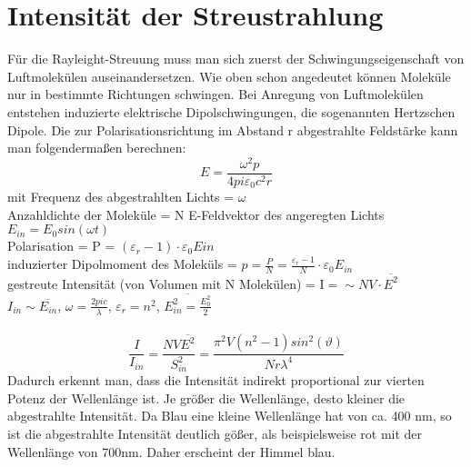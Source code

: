 \section{ Intensität der Streustrahlung}
Für die Rayleight-Streuung muss man sich zuerst der Schwingungseigenschaft von Luftmolekülen auseinandersetzen. Wie oben schon angedeutet können Moleküle nur in bestimmte Richtungen schwingen. Bei Anregung von Luftmolekülen entstehen induzierte elektrische Dipolschwingungen, die sogenannten Hertzschen Dipole. 
Die zur Polarisationsrichtung im Abstand r abgestrahlte Feldstärke kann man folgendermaßen berechnen:
\begin{equation}
E=\frac{\omega^2p}{4pi\varepsilon_0c^2r}
\end{equation}
mit Frequenz des abgestrahlten Lichts = $\omega$\\
Anzahldichte der Moleküle = N
E-Feldvektor des angeregten Lichts $E_{in}=E_0sin(\omega t)$\\
Polarisation = P = $(\varepsilon_r-1)\cdot\varepsilon_0E{in}$\\
induzierter Dipolmoment des Moleküls = $p=\frac{P}{N}=\frac{\varepsilon_r-1}{N}\cdot\varepsilon_0E_{in}$\\
gestreute Intensität (von Volumen mit N Molekülen) = I$=\sim NV\cdot\overline{E^2}$\\
$I_{in}\sim\overline{E_{in}}$, $\omega=\frac{2pic}{\lambda}$, $\varepsilon_r=n^2$, $\overline{E^2_{in}=\frac{E_0^2}{2}}$  \\\\
\begin{equation}
\frac{I}{I_{in}}=\frac{NV\overline{E^2}}{S^2_{in}}=\frac{\pi^2V(n^2-1)sin^2(\vartheta)}{Nr\lambda^4}
\end{equation}
Dadurch erkennt man, dass die Intensität indirekt proportional zur vierten Potenz der Wellenlänge ist. Je größer die Wellenlänge, desto kleiner die abgestrahlte Intensität. Da Blau eine kleine Wellenlänge hat von ca. 400 nm, so ist die abgestrahlte Intensität deutlich gößer, als beispielsweise rot mit der Wellenlänge von 700nm.  Daher erscheint der Himmel blau. 


